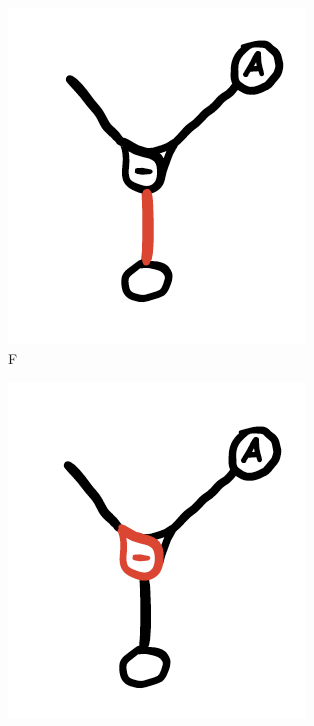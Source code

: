 \documentclass[12pt,twoside]{reedthesis}
\begin{document}
	\begin{figure}[H]
	\centering
	\begin{subfigure}{0.3\textwidth}
		\centering
		\includegraphics[width=\textwidth, frame]{Images/Diagram5}
		\caption{F}
	\end{subfigure}
	\hfill
	\begin{subfigure}{0.3\textwidth}
		\centering
		\includegraphics[width=\textwidth, frame]{Images/Diagram6}

\end{subfigure}
\end{figure}
\end{document}
